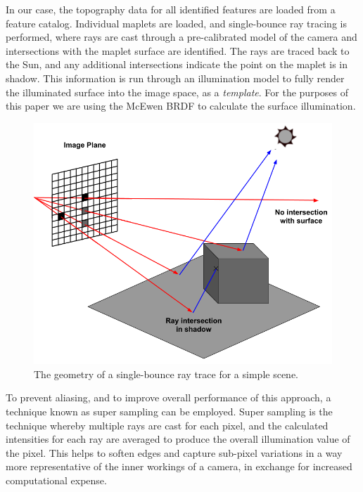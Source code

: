 \documentclass{src/RPI-SIW}
\begin{document}
In our case, the topography data for all identified features are loaded from a feature catalog.  Individual maplets are loaded, and single-bounce ray tracing is performed, where rays are cast through a pre-calibrated model of the camera and intersections with the maplet surface are identified.  The rays are traced back to the Sun, and any additional intersections indicate the point on the maplet is in shadow.  This information is run through an illumination model to fully render the illuminated surface into the image space, as a \textit{template}.  For the purposes of this paper we are using the McEwen BRDF to calculate the surface illumination.\cite{mcewen}
\begin{figure}
	\centering
	\includegraphics[width=\columnwidth]{ray_tracing.png}
	\caption{The geometry of a single-bounce ray trace for a simple scene.}
	\label{figs::ray_tracing}
\end{figure}

To prevent aliasing, and to improve overall performance of this approach, a technique known as super sampling can be employed.  Super sampling is the technique whereby multiple rays are cast for each pixel, and the calculated intensities for each ray are averaged to produce the overall illumination value of the pixel.  This helps to soften edges and capture sub-pixel variations in a way more representative of the inner workings of a camera, in exchange for increased computational expense.
\end{document}
